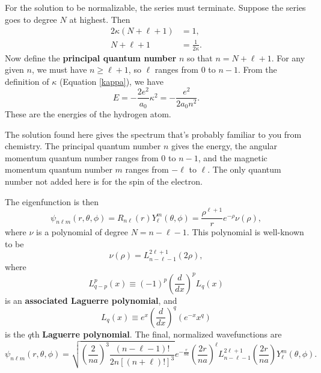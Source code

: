 For the solution to be normalizable, the series must terminate. Suppose the series goes to degree $N$ at highest. Then
\begin{align*}
    2\kappa (N+\ell+1) &= 1,\\
    N + \ell + 1 &= \frac{1}{2\kappa}.
\end{align*}
Now define the \textbf{principal quantum number} $n$ so that $n = N + \ell + 1$. For any given $n$, we must have $n \geq \ell+1$, so $\ell$ ranges from $0$ to $n-1$. From the definition of $\kappa$ (Equation \ref{kappa}), we have 
\begin{equation}
    E = -\frac{2e^2}{a_0} \kappa^2 = -\frac{e^2}{2a_0n^2}.
\end{equation}
These are the energies of the hydrogen atom.

The solution found here gives the spectrum that's probably familiar to you from chemistry. The principal quantum number $n$ gives the energy, the angular momentum quantum number ranges from $0$ to $n-1$, and the magnetic momentum quantum number $m$ ranges from $-\ell$ to $\ell$. The only quantum number not added here is for the spin of the electron.

The eigenfunction is then \[ \psi_{n\ell m} (r, \theta, \phi) = R_{n \ell} (r) Y_\ell^m (\theta, \phi) = \frac{\rho^{\ell+1}}{r} e^{-\rho} \nu (\rho),\] where $\nu$ is a polynomial of degree $N = n - \ell - 1$. This polynomial is well-known to be 
$$\nu (\rho) = L_{n-\ell-1}^{2\ell+1} (2\rho), $$ where $$L_{q-p}^p (x) \equiv (-1)^p \left( \frac{d}{dx} \right)^p L_q (x)$$ is an \textbf{associated Laguerre polynomial}, and $$L_q (x) \equiv e^x \left(\frac{d}{dx} \right)^q (e^{-x} x^q)$$ is the $q$th \textbf{Laguerre polynomial}. The final, normalized wavefunctions are
\begin{equation}
    \psi_{n\ell m} (r, \theta, \phi) = \sqrt{\left( \frac{2}{na} \right)^3 \frac{(n-\ell-1)!}{2n[(n+\ell)!]^3}} e^{-\frac{r}{na}} \left( \frac{2r}{na}\right)^\ell L_{n-\ell-1}^{2\ell+1} \left(\frac{2r}{na} \right) Y_\ell^m (\theta, \phi).
\end{equation}